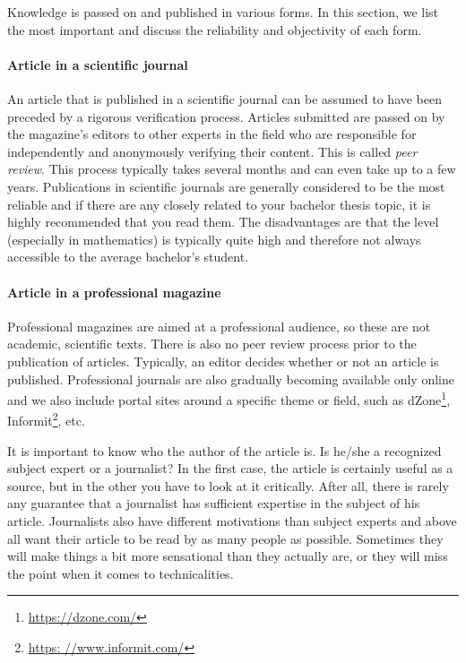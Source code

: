 Knowledge is passed on and published in various forms. In this section, we list the most important and discuss the reliability and objectivity of each form.

\paragraph{Article in a scientific journal}

An article that is published in a scientific journal can be assumed to have been preceded by a rigorous verification process. Articles submitted are passed on by the magazine's editors to other experts in the field who are responsible for independently and anonymously verifying their content. This is called \emph{peer review}. This process typically takes several months and can even take up to a few years. Publications in scientific journals are generally considered to be the most reliable and if there are any closely related to your bachelor thesis topic, it is highly recommended that you read them. The disadvantages are that the level (especially in mathematics) is typically quite high and therefore not always accessible to the average bachelor's student.

\paragraph{Article in a professional magazine}

Professional magazines are aimed at a professional audience, so these are not academic, scientific texts. There is also no peer review process prior to the publication of articles. Typically, an editor decides whether or not an article is published. Professional journals are also gradually becoming available only online and we also include portal sites around a specific theme or field, such as dZone\footnote{\url{https://dzone.com/}}, Informit\footnote{\url{https: //www.informit.com/}}, etc.

It is important to know who the author of the article is. Is he/she a recognized subject expert or a journalist? In the first case, the article is certainly useful as a source, but in the other you have to look at it critically. After all, there is rarely any guarantee that a journalist has sufficient expertise in the subject of his article. Journalists also have different motivations than subject experts and above all want their article to be read by as many people as possible. Sometimes they will make things a bit more sensational than they actually are, or they will miss the point when it comes to technicalities.

